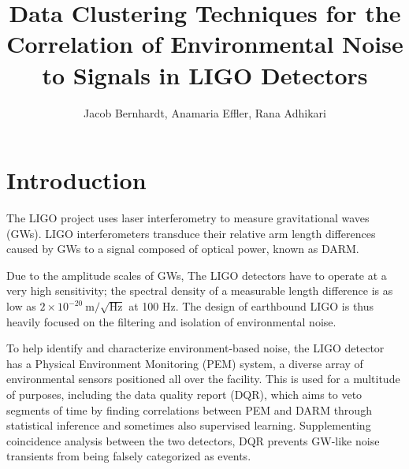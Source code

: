 \documentclass[colorlinks=true,pdfstartview=FitV,linkcolor=blue,
            citecolor=red,urlcolor=magenta]{ligodoc}
\title{Data Clustering Techniques for the Correlation of Environmental Noise to Signals in LIGO Detectors}
\author{Jacob Bernhardt, Anamaria Effler, Rana Adhikari}
\begin{document}
\section{Introduction}
The LIGO project uses laser interferometry to measure gravitational waves (GWs).
LIGO interferometers transduce their relative arm length differences caused by GWs to a signal composed of optical power, known as DARM.

Due to the amplitude scales of GWs, The LIGO detectors have to operate at a very high sensitivity; the spectral density of a measurable length difference is as low as $2\times 10^{-20}~\mathrm{m}/\sqrt{\mathrm{Hz}}$ at 100 Hz.
The design of earthbound LIGO is thus heavily focused on the filtering and isolation of environmental noise.

To help identify and characterize environment-based noise, the LIGO detector has a Physical Environment Monitoring (PEM) system, a diverse array of environmental sensors positioned all over the facility\cite{aepaper}.
This is used for a multitude of purposes, including the data quality report (DQR), which aims to veto segments of time by finding correlations between PEM and DARM through statistical inference and sometimes also supervised learning.
Supplementing coincidence analysis between the two detectors, DQR prevents GW-like noise transients from being falsely categorized as events.
\end{document}
